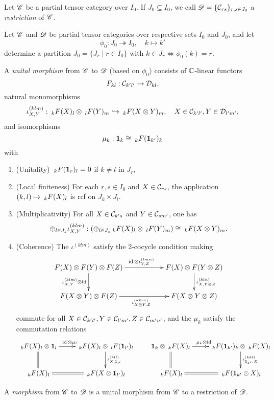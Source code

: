 \begin{Def} Let $\CatCC$ be a partial tensor category over $I_0$. If $J_0\subseteq I_0$, we call $\CatDD = \{\CatC_{rs}\}_{r,s\in J_0}$ a \emph{restriction} of $\CatCC$. 
\end{Def} 

\begin{Def} Let $\CatCC$ and $\CatDD$ be partial tensor categories over respective sets $I_0$ and $J_0$, and let \[\phi_0:J_0\twoheadrightarrow I_0,\quad k\mapsto k'\] determine a partition $J_0 = \{J_r\mid r\in I_0\}$ with $k\in J_r \iff \phi_0(k)=r$. 

A \emph{unital morphism} from $\CatCC$ to $\CatDD$ (based on $\phi_0$) consists of $\C$-linear functors \[F_{kl}: \CatC_{k'l'}\rightarrow \CatD_{kl},\] natural monomorphisms \[\iota^{(klm)}_{X,Y}: \GrDA{F(X)}{k}{l} \otimes \GrDA{F(Y)}{l}{m} \hookrightarrow \GrDA{F(X\otimes Y)}{k}{m}, \quad X\in \CatC_{k'l'},Y\in \CatD_{l'm'},\] and isomorphisms \[\mu_{k}:  \Unit_k \cong \GrDA{F(\Unit_{k'})}{k}{k}\] with \begin{enumerate}[label=(\alph*)]
\item (Unitality)  $\GrDA{F(\Unit_{r})}{k}{l}= 0$ if $k\neq l$ in $J_r$,
\item (Local finiteness) For each $r,s\in I_0$ and $X\in \CatC_{rs}$, the application $(k,l)\mapsto \GrDA{F(X)}{k}{l}$ is rcf on $J_k\times J_l$. 
\item (Multiplicativity) For all $X\in \CatC_{k's}$ and $Y\in \CatC_{sm'}$, one has\[\oplus_{l\in J_s} \iota^{(klm)}_{X,Y}: \left(\oplus_{l\in J_s} \GrDA{F(X)}{k}{l} \otimes \GrDA{F(Y)}{l}{m}\right) \cong \GrDA{F(X\otimes Y)}{k}{m}.\]
\item (Coherence) %
The $\iota^{(klm)}$ satisfy the 2-cocycle condition making \[\xymatrix{F(X)\otimes F(Y)\otimes F(Z) \ar[rr]^{\id\otimes \iota^{(lmn)}_{Y,Z}} \ar[d]_{\iota^{(klm)}_{X,Y}\otimes\id}&& F(X)\otimes F(Y\otimes Z)\ar[d]^{\iota^{(kln)}_{X,Y\otimes Z}}\\ F(X\otimes Y)\otimes F(Z) \ar[rr]_{\iota^{(kmn)}_{X\otimes Y,Z}}&& F(X\otimes Y \otimes Z)}\] commute for all $X\in \CatC_{k'l'},Y\in \CatC_{l'm'}, Z\in \CatC_{m'n'}$, and the $\mu_k$ satisfy the commutation relations \[\xymatrix{ \GrDA{F(X)}{k}{l}\otimes \Unit_l \ar[r]^{\!\!\!\!\id\otimes \mu_l} \ar@{=}[d] & \GrDA{F(X)}{k}{l} \otimes \GrDA{F(\Unit_{l'})}{l}{l} \ar[d]^{\iota^{(kll)}_{X, \Unit_{l'}}} \\ \GrDA{F(X)}{k}{l} & \ar@{=}[l] \GrDA{F(X\otimes \Unit_{l'})}{k}{l}} \qquad \xymatrix{  \Unit_k\otimes \GrDA{F(X)}{k}{l}\ar[r]^{\!\!\!\!\mu_k\otimes \id} \ar@{=}[d] & \GrDA{F(\Unit_{k'})}{k}{k} \otimes \GrDA{F(X)}{k}{l} \ar[d]^{\iota^{(kkl)}_{\Unit_{k'},X}} \\ \GrDA{F(X)}{k}{l} & \ar@{=}[l] \GrDA{ F(\Unit_{k'}\otimes X)}{k}{l}} \]
\end{enumerate}

A \emph{morphism} from $\CatCC$ to $\CatDD$ is a unital morphism from $\CatCC$ to a restriction of $\CatDD$. 
\end{Def}

